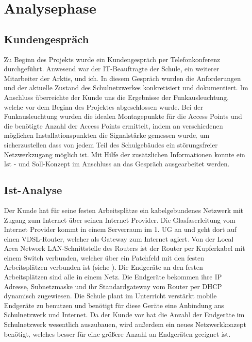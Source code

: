 \section{Analysephase} 
\label{sec:Analysephase}

\subsection{Kundengespräch}
\label{sec:Kundengespräch}
Zu Beginn des Projekts wurde ein Kundengespräch per Telefonkonferenz durchgeführt. Anwesend war der IT-Beauftragte der Schule, ein weiterer Mitarbeiter der Arktis, und ich. In diesem Gespräch wurden die Anforderungen und der aktuelle Zustand des Schulnetzwerkes konkretisiert und dokumentiert. Im Anschluss überreichte der Kunde uns die Ergebnisse der Funkausleuchtung, welche vor dem Beginn des Projektes abgeschlossen wurde. Bei der Funkausleuchtung wurden die idealen Montagepunkte für die Access Points  und die benötigte Anzahl der Access Points ermittelt, indem an verschiedenen möglichen Installationspunkten die Signalstärke gemessen wurde, um sicherzustellen dass von jedem Teil des Schulgebäudes ein störungsfreier Netzwerkzugang möglich ist. Mit Hilfe der zusätzlichen Informationen konnte ein Ist - und Soll-Konzept im Anschluss an das Gespräch ausgearbeitet werden. 

\subsection{Ist-Analyse} 
\label{sec:IstAnalyse}
Der Kunde hat für seine festen Arbeitsplätze ein kabelgebundenes Netzwerk mit Zugang zum Internet über seinen Internet Provider. 
Die Glasfaserleitung vom Internet Provider kommt in einem Serverraum im 1. \ac{UG} an und geht dort auf einen \acs{VDSL}-Router, welcher als Gateway zum Internet agiert. Von der Local Area Network \acs{LAN}-Schnittstelle des Routers ist der Router per Kupferkabel mit einem Switch verbunden, welcher über ein Patchfeld mit den festen Arbeitsplätzen verbunden ist (siehe ). Die Endgeräte an den festen Arbeitsplätzen sind alle in einem Netz. Die Endgeräte bekommen ihre IP Adresse, Subnetzmaske und ihr Standardgateway vom Router per \acs{DHCP} dynamisch zugewiesen. Die Schule plant im Unterricht verstärkt mobile Endgeräte zu benutzen und benötigt für diese Geräte eine Anbindung ans Schulnetzwerk und Internet. Da der Kunde vor hat die Anzahl der Endgeräte im Schulnetzwerk wesentlich auszubauen, wird außerdem ein neues Netzwerkkonzept benötigt, welches besser für eine größere Anzahl an Endgeräten geeignet ist. 

